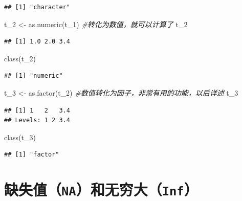 \documentclass[
]{book}
\newenvironment{Shaded}{\begin{snugshade}}{\end{snugshade}}
\newcommand{\CommentTok}[1]{\textcolor[rgb]{0.56,0.35,0.01}{\textit{#1}}}
\newcommand{\FunctionTok}[1]{\textcolor[rgb]{0.00,0.00,0.00}{#1}}
\newcommand{\NormalTok}[1]{#1}
\newcommand{\OtherTok}[1]{\textcolor[rgb]{0.56,0.35,0.01}{#1}}
\begin{document}
\begin{verbatim}
## [1] "character"
\end{verbatim}

\begin{Shaded}
\begin{Highlighting}[]
\NormalTok{t\_2 }\OtherTok{\textless{}{-}} \FunctionTok{as.numeric}\NormalTok{(t\_1) }\CommentTok{\#转化为数值，就可以计算了}
\NormalTok{t\_2}
\end{Highlighting}
\end{Shaded}

\begin{verbatim}
## [1] 1.0 2.0 3.4
\end{verbatim}

\begin{Shaded}
\begin{Highlighting}[]
\FunctionTok{class}\NormalTok{(t\_2)}
\end{Highlighting}
\end{Shaded}

\begin{verbatim}
## [1] "numeric"
\end{verbatim}

\begin{Shaded}
\begin{Highlighting}[]
\NormalTok{t\_3 }\OtherTok{\textless{}{-}} \FunctionTok{as.factor}\NormalTok{(t\_2) }\CommentTok{\#数值转化为因子，非常有用的功能，以后详述}
\NormalTok{t\_3}
\end{Highlighting}
\end{Shaded}

\begin{verbatim}
## [1] 1   2   3.4
## Levels: 1 2 3.4
\end{verbatim}

\begin{Shaded}
\begin{Highlighting}[]
\FunctionTok{class}\NormalTok{(t\_3)}
\end{Highlighting}
\end{Shaded}

\begin{verbatim}
## [1] "factor"
\end{verbatim}

\hypertarget{ux7f3aux5931ux503cnaux548cux65e0ux7a77ux5927inf}{%
\section{\texorpdfstring{缺失值（\texttt{NA}）和无穷大（\texttt{Inf}）}{缺失值（NA）和无穷大（Inf）}}\label{ux7f3aux5931ux503cnaux548cux65e0ux7a77ux5927inf}}
\end{document}
